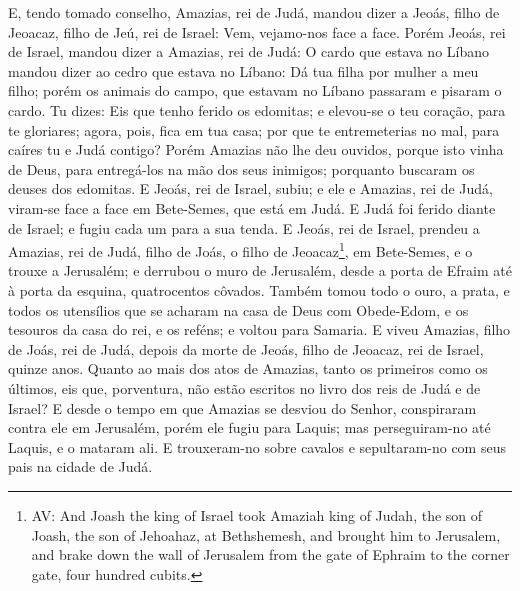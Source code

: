 E, tendo tomado conselho, Amazias, rei de Judá, mandou dizer a
Jeoás, filho de Jeoacaz, filho de Jeú, rei de Israel: Vem,
vejamo-nos face a face. Porém Jeoás, rei de Israel, mandou
dizer a Amazias, rei de Judá: O cardo que estava no Líbano mandou
dizer ao cedro que estava no Líbano: Dá tua filha por mulher a meu
filho; porém os animais do campo, que estavam no Líbano passaram e
pisaram o cardo. Tu dizes: Eis que tenho ferido os edomitas;
e elevou-se o teu coração, para te gloriares; agora, pois, fica em
tua casa; por que te entremeterias no mal, para caíres tu e Judá
contigo? Porém Amazias não lhe deu ouvidos, porque isto vinha
de Deus, para entregá-los na mão dos seus inimigos; porquanto
buscaram os deuses dos edomitas. E Jeoás, rei de Israel,
subiu; e ele e Amazias, rei de Judá, viram-se face a face em
Bete-Semes, que está em Judá. E Judá foi ferido diante de
Israel; e fugiu cada um para a sua tenda. E Jeoás, rei de
Israel, prendeu a Amazias, rei de Judá, filho de Joás, o filho de
Jeoacaz\footnote{AV: And Joash the king of Israel took Amaziah king
of Judah, the son of Joash, the son of Jehoahaz, at Bethshemesh, and
brought him to Jerusalem, and brake down the wall of Jerusalem from
the gate of Ephraim to the corner gate, four hundred cubits.}, em
Bete-Semes, e o trouxe a Jerusalém; e derrubou o muro de Jerusalém,
desde a porta de Efraim até à porta da esquina, quatrocentos
côvados. Também tomou todo o ouro, a prata, e todos os
utensílios que se acharam na casa de Deus com Obede-Edom, e os
tesouros da casa do rei, e os reféns; e voltou para Samaria.
E viveu Amazias, filho de Joás, rei de Judá, depois da morte
de Jeoás, filho de Jeoacaz, rei de Israel, quinze anos.
Quanto ao mais dos atos de Amazias, tanto os primeiros como
os últimos, eis que, porventura, não estão escritos no livro dos
reis de Judá e de Israel? E desde o tempo em que Amazias se
desviou do Senhor, conspiraram contra ele em Jerusalém, porém ele
fugiu para Laquis; mas perseguiram-no até Laquis, e o mataram ali.
E trouxeram-no sobre cavalos e sepultaram-no com seus pais na
cidade de Judá.

\medskip


